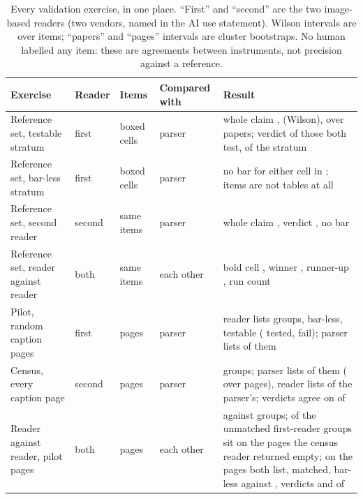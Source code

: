 \documentclass[sigconf,anonymous]{aamas}
\begin{document}
\begin{table}[t]
\caption{Every validation exercise, in one place. ``First'' and ``second''
are the two image-based readers (two vendors, named in the AI use
statement). Wilson intervals are over items; ``papers'' and ``pages''
intervals are cluster bootstraps. No human labelled any item: these are
agreements between instruments, not precision against a reference.}
\label{tab:validation}
\scriptsize
\centering
\setlength{\tabcolsep}{3pt}
\begin{tabular}{@{}p{2.7cm}lp{1.9cm}p{1.8cm}p{10.4cm}@{}}
\toprule
Exercise & Reader & Items & Compared with & Result \\
\midrule
Reference set, testable stratum & first & \nGTestableN{} boxed cells & parser & whole claim \nGClaimFrac{}, \nGClaim{} (Wilson), \nGClaimPaperCi{} over papers; verdict \nGVerdictFrac{} of those both test, \nGVerdictFullFrac{} of the stratum \\
Reference set, bar-less stratum & first & \nGNoBarN{} boxed cells & parser & no bar for either cell in \nGNoBarAbsentFrac{}; \nGNoBarNotTable{} items are not tables at all \\
Reference set, second reader & second & same items & parser & whole claim \nGThreeClaimFrac{}, verdict \nGThreeVerdictFrac{}, no bar \nGThreeNoBarAbsentFrac{} \\
Reference set, reader against reader & both & same items & each other & bold cell \nReadersAgreeBold{}, winner \nReadersAgreeWinner{}, runner-up \nReadersAgreeRunner{}, run count \nReadersAgreeRuns{} \\
Pilot, random caption pages & first & \nPagesRead{} pages & parser & reader lists \nPagesReaderGroups{} groups, \nPagesReaderNeither{} bar-less, \nPagesReaderTestable{} testable (\nPagesReaderFailN{} tested, \nPagesReaderFail{} fail); parser lists \nPagesReaderFoundPct{} of them \\
Census, every caption page & second & \nCzPagesRead{} pages & parser & \nCzGroups{} groups; parser lists \nCzReaderFoundPct{} of them (\nCzReaderFoundPageCi{} over pages), reader lists \nCzPipeFoundPct{} of the parser's; verdicts agree on \nCzSharedAgree{} of \nCzShared{} \\
Reader against reader, pilot pages & both & \nCcrPages{} pages & each other & \nCcrFirstGroups{} against \nCcrSecondGroups{} groups; \nCcrUnmatchedOnEmptyPages{} of the \nCcrFirstUnmatched{} unmatched first-reader groups sit on the \nCcrPagesSecondEmpty{} pages the census reader returned empty; on the \nCcrSharedPages{} pages both list, \nCcrSharedMatchedPct{} matched, bar-less \nCcrSharedFirstNeither{} against \nCcrSharedSecondNeither{}, verdicts \nCcrSharedNeitherAgreePct{} and \nCcrSharedFailAgree{} of \nCcrSharedBothTested{} \\

\end{tabular}
\end{table}
\end{document}
